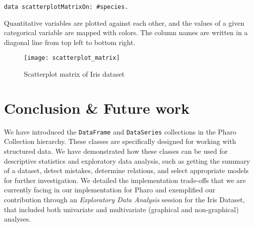 \documentclass[sigplan]{acmart}
\begin{document}
\begin{lstlisting}[basicstyle=\small,language=Smalltalk]
data scatterplotMatrixOn: #species.
\end{lstlisting}

Quantitative variables are plotted against each other, and the values of a given categorical variable are mapped with colors. The column names are written in a diagonal line from top left to bottom right.

\begin{figure}[H]
  \begin{center}
  \texttt{[image: scatterplot\_matrix]}
  \caption{Scatterplot matrix of Iris dataset}
  \end{center}
\end{figure}

%
%


%

\section{Conclusion \& Future work}
\label{sec:conclusion}
We have introduced the \texttt{DataFrame} and \texttt{DataSeries} collections in the Pharo Collection hierarchy. These classes are specifically designed for working with structured data. We have demonstrated how these classes can be used for descriptive statistics and exploratory data analysis, such as getting the summary of a dataset, detect mistakes, determine relations, and select appropriate models for further investigation. We detailed the implementation trade-offs that we are currently facing in our implementation for Pharo and exemplified our contribution through an \textit{Exploratory Data Analysis} session for the Iris Dataset, that included both univariate and multivariate (graphical and non-graphical) analyses. 
\end{document}
